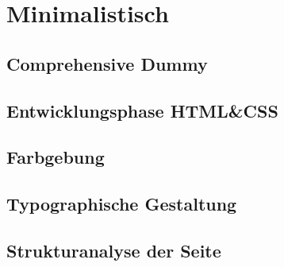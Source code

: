 \section{Minimalistisch}

	\subsection{Comprehensive Dummy}

	\subsection{Entwicklungsphase HTML\&CSS}

	\subsection{Farbgebung}

	\subsection{Typographische Gestaltung}

	\subsection{Strukturanalyse der Seite}
